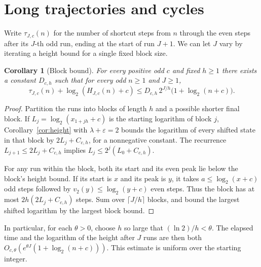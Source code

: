\documentclass[11pt]{article}
\newtheorem{corollary}[theorem]{Corollary}
\theoremstyle{definition}
\begin{document}
\section{Long trajectories and cycles}\label{sec:asymptotic}

Write \(\tau_{J,c}(n)\) for the number of shortcut steps from \(n\)
through the even steps after its \(J\)-th odd run, ending at the
start of run \(J+1\). We can let \(J\) vary by iterating a height
bound for a single fixed block size.

\begin{corollary}[Block bound]\label{cor:blocks}
For every positive odd \(c\) and fixed \(h\ge1\) there exists
a constant \(D_{c,h}\) such that for every odd \(n\ge1\) and \(J\ge1\),
\[
 \tau_{J,c}(n)+\log_2(H_{J,c}(n)+c)
 \le D_{c,h}\,2^{J/h}\bigl(1+\log_2(n+c)\bigr).
\]
\end{corollary}

\begin{proof}
Partition the runs into blocks of length \(h\) and a possible shorter
final block. If \(L_j=\log_2(x_{1+jh}+c)\) is the starting logarithm
of block \(j\), Corollary~\ref{cor:height} with
\(\lambda+\varepsilon=2\) bounds the logarithm of every shifted state
in that block by \(2L_j+C_{c,h}\), for a nonnegative constant.
The recurrence \(L_{j+1}\le2L_j+C_{c,h}\) implies
\(L_j\le2^j(L_0+C_{c,h})\).

For any run within the block, both its start and its even peak lie
below the block's height bound. If its start is \(x\) and its peak is
\(y\), it takes \(a\le\log_2(x+c)\) odd steps followed by
\(v_2(y)\le\log_2(y+c)\) even steps. Thus the block has at most
\(2h(2L_j+C_{c,h})\) steps. Sum over \(\lceil J/h\rceil\) blocks,
and bound the largest shifted logarithm by the largest block bound.
\end{proof}

In particular, for each \(\theta>0\), choose \(h\) so large that
\((\ln 2)/h<\theta\). The elapsed time and the logarithm of the
height after \(J\) runs are then both
\(O_{c,\theta}(e^{\theta J}(1+\log_2(n+c)))\). This estimate is
uniform over the starting integer.
\end{document}
